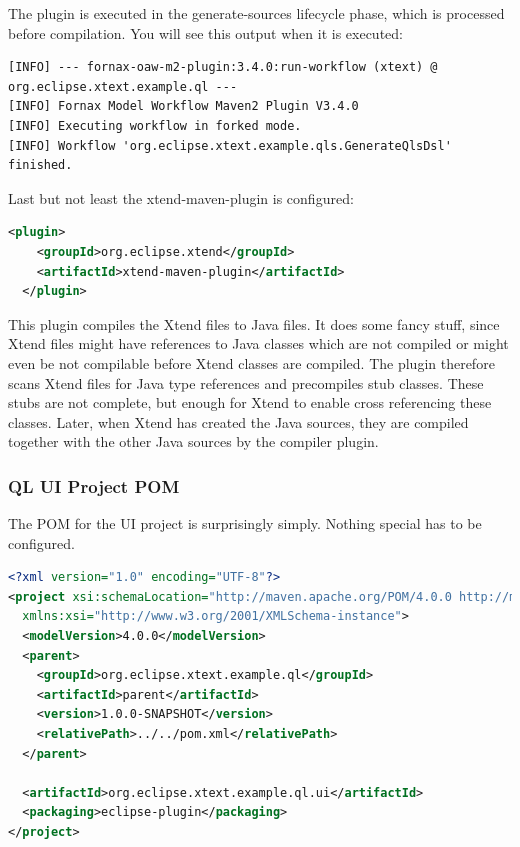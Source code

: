 The plugin is executed in the generate-sources lifecycle phase, which is
processed before compilation. You will see this output when it is executed:

\begin{lstlisting}
[INFO] --- fornax-oaw-m2-plugin:3.4.0:run-workflow (xtext) @ org.eclipse.xtext.example.ql ---
[INFO] Fornax Model Workflow Maven2 Plugin V3.4.0
[INFO] Executing workflow in forked mode.
[INFO] Workflow 'org.eclipse.xtext.example.qls.GenerateQlsDsl' finished.
\end{lstlisting}

Last but not least the xtend-maven-plugin is configured:
\begin{lstlisting}[language=XML]
  <plugin>
    <groupId>org.eclipse.xtend</groupId>
    <artifactId>xtend-maven-plugin</artifactId>
  </plugin>
\end{lstlisting}

This plugin compiles the Xtend files to Java files. It does some fancy stuff,
since Xtend files might have references to Java classes which are not compiled
or might even be not compilable before Xtend classes are compiled. The plugin
therefore scans Xtend files for Java type references and precompiles stub
classes. These stubs are not complete, but enough for Xtend to enable cross
referencing these classes. Later, when Xtend has created the Java sources, they
are compiled together with the other Java sources by the compiler plugin.

\subsubsection{QL UI Project POM}
The POM for the UI project is surprisingly simply. Nothing special has to be
configured.

\begin{lstlisting}[language=XML]
<?xml version="1.0" encoding="UTF-8"?>
<project xsi:schemaLocation="http://maven.apache.org/POM/4.0.0 http://maven.apache.org/xsd/maven-4.0.0.xsd" xmlns="http://maven.apache.org/POM/4.0.0"
  xmlns:xsi="http://www.w3.org/2001/XMLSchema-instance">
  <modelVersion>4.0.0</modelVersion>
  <parent>
    <groupId>org.eclipse.xtext.example.ql</groupId>
    <artifactId>parent</artifactId>
    <version>1.0.0-SNAPSHOT</version>
    <relativePath>../../pom.xml</relativePath>
  </parent>

  <artifactId>org.eclipse.xtext.example.ql.ui</artifactId>
  <packaging>eclipse-plugin</packaging>
</project>
\end{lstlisting}

